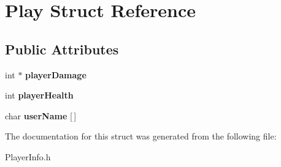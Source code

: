 \hypertarget{struct_play}{\section{Play Struct Reference}
\label{struct_play}
}
\subsection*{Public Attributes}
\begin{DoxyCompactItemize}
\item 
\hypertarget{struct_play_ac937f89a2cff0d973be6a7996d327d69}{int $\ast$ {\bfseries player\+Damage}}\label{struct_play_ac937f89a2cff0d973be6a7996d327d69}

\item 
\hypertarget{struct_play_acd4b4302358063ac72cb35f970096a5a}{int {\bfseries player\+Health}}\label{struct_play_acd4b4302358063ac72cb35f970096a5a}

\item 
\hypertarget{struct_play_a4d9060044c087e729eaf90363683a136}{char {\bfseries user\+Name} \mbox{[}$\,$\mbox{]}}\label{struct_play_a4d9060044c087e729eaf90363683a136}

\end{DoxyCompactItemize}


The documentation for this struct was generated from the following file\+:\begin{DoxyCompactItemize}
\item 
Player\+Info.\+h\end{DoxyCompactItemize}
